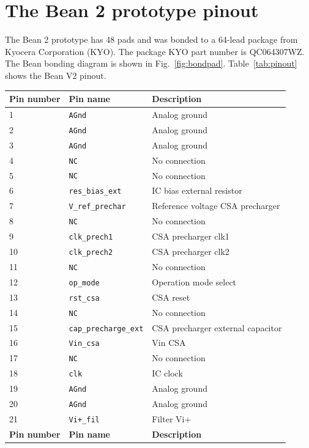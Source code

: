 \chapter{The Bean 2 prototype pinout} 
\label{appendix1}
The Bean 2 prototype has 48 pads and was bonded to a 64-lead package from \mbox{Kyocera} Corporation (KYO). The package KYO part number is QC064307WZ. The Bean bonding diagram is shown in Fig.~\ref{fig:bondpad}.
Table~\ref{tab:pinout} shows the Bean V2 pinout.

\begin{center}
\begin{longtable}{|l|l|l|}\hline
{\bf Pin number} & {\bf Pin name} & {\bf Description} \\ \hline\hline
1 & \verb=AGnd= & Analog ground \\\hline
2 & \verb=AGnd= & Analog ground \\\hline
3 & \verb=AGnd= & Analog ground \\\hline
4 & \verb=NC= & No connection \\\hline
5 & \verb=NC= & No connection \\\hline
6 & \verb=res_bias_ext= & IC bias external resistor \\\hline
7 & \verb=V_ref_prechar= & Reference voltage CSA precharger \\\hline
8 & \verb=NC= & No connection  \\\hline
9 &  \verb=clk_prech1= & CSA precharger clk1  \\\hline
10 & \verb=clk_prech2= & CSA precharger clk2  \\\hline
11 & \verb=NC= & No connection \\\hline
12 & \verb=op_mode= & Operation mode select \\\hline
13 & \verb=rst_csa= & CSA reset  \\\hline
14 & \verb=NC= & No connection \\\hline
15 & \verb=cap_precharge_ext= & CSA precharger external capacitor \\\hline
16 & \verb=Vin_csa= & Vin CSA \\\hline
17 & \verb=NC= & No connection \\\hline
18 & \verb=clk= & IC clock \\\hline
19 & \verb=AGnd= & Analog ground \\\hline
20 & \verb=AGnd= & Analog ground \\\hline
21 & \verb=Vi+_fil= & Filter Vi+ \\\hline
{\bf Pin number} & {\bf Pin name} & {\bf Description} \\ \hline\hline

\end{longtable}
\end{center}
